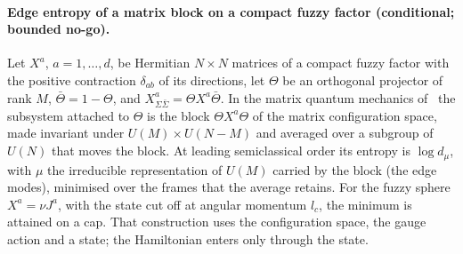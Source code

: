 \paragraph{Edge entropy of a matrix block on a compact fuzzy factor (conditional; bounded no-go).}
Let \(X^a\), \(a=1,\dots,d\), be Hermitian \(N\times N\) matrices of a compact fuzzy factor with the positive contraction \(\delta_{ab}\) of its directions, let \(\Theta\) be an orthogonal projector of rank \(M\), \(\bar\Theta=1-\Theta\), and \(X^a_{\Sigma\bar\Sigma}=\Theta X^a\bar\Theta\). In the matrix quantum mechanics of~\cite{FlissFrenkelHartnollSoni2025} the subsystem attached to \(\Theta\) is the block \(\Theta X^a\Theta\) of the matrix configuration space, made invariant under \(U(M)\times U(N-M)\) and averaged over a subgroup of \(U(N)\) that moves the block. At leading semiclassical order its entropy is \(\log d_\mu\), with \(\mu\) the irreducible representation of \(U(M)\) carried by the block (the edge modes), minimised over the frames that the average retains. For the fuzzy sphere \(X^a=\nu J^a\), with the state cut off at angular momentum \(l_c\), the minimum is attained on a cap. That construction uses the configuration space, the gauge action and a state; the Hamiltonian enters only through the state.

